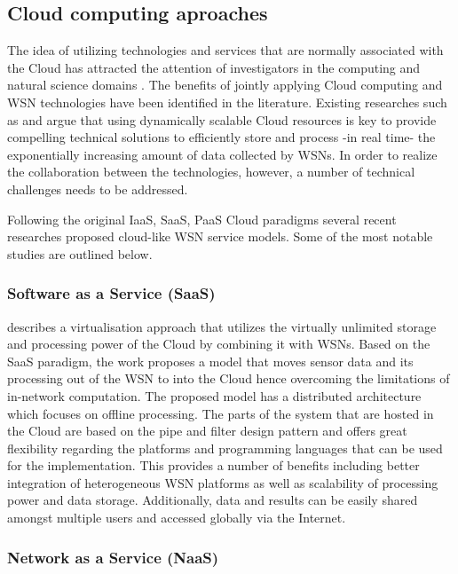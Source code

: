 \subsection{Cloud computing aproaches}
The idea of utilizing technologies and services that are normally associated with the Cloud has attracted the attention of investigators in the computing and natural science domains \cite{Kurschl:2009:CCC:1806338.1806435,ahmed2011integrating,rolim2010cloud}. The benefits of jointly applying Cloud computing and WSN technologies have been identified in the literature. Existing researches such as \cite{liu2011opportunities} and \cite{hassan2009framework} argue that using dynamically scalable Cloud resources is key to provide compelling technical solutions to efficiently store and process -in real time- the exponentially increasing amount of data collected by WSNs. In order to realize the collaboration between the technologies, however, a number of technical challenges needs to be addressed.

Following the original IaaS, SaaS, PaaS Cloud paradigms \cite{lenk2009s} several recent researches proposed cloud-like WSN service models. Some of the most notable studies are outlined below.

\subsubsection{Software as a Service (SaaS)}
\cite{Kurschl:2009:CCC:1806338.1806435} describes a virtualisation approach that utilizes the virtually unlimited storage and processing power of the Cloud by combining it with WSNs. Based on the SaaS paradigm, the work proposes a model that moves sensor data and its processing out of the WSN to into the Cloud hence overcoming the limitations of in-network computation. The proposed model has a distributed architecture which focuses on offline processing. The parts of the system that are hosted in the Cloud are based on the pipe and filter design pattern and offers great flexibility regarding the platforms and programming languages that can be used for the implementation. This provides a number of benefits including
better integration of heterogeneous WSN platforms as well as scalability of processing power and data storage.  Additionally, data and results can be easily shared amongst multiple users and accessed globally via the Internet.

\subsubsection{Network as a Service (NaaS)}

